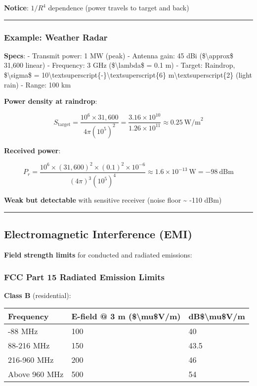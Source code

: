 \textbf{Notice}: \(1/R^4\) dependence (power travels to target and back)

\begin{center}\rule{0.5\linewidth}{0.5pt}\end{center}

\subsubsection{Example: Weather Radar}\label{example-weather-radar}

\textbf{Specs}: - Transmit power: 1 MW (peak) - Antenna gain: 45 dBi
(\$\textbackslash approx\$ 31,600 linear) - Frequency: 3 GHz
(\$\textbackslash lambda\$ = 0.1 m) - Target: Raindrop,
\$\textbackslash sigma\$ =
10\textbackslash textsuperscript\{-\}\textbackslash textsuperscript\{6\}
m\textbackslash textsuperscript\{2\} (light rain) - Range: 100 km

\textbf{Power density at raindrop}:

\[
S_{\text{target}} = \frac{10^6 \times 31,600}{4\pi (10^5)^2} = \frac{3.16 \times 10^{10}}{1.26 \times 10^{11}} \approx 0.25\ \text{W/m}^2
\]

\textbf{Received power}:

\[
P_r = \frac{10^6 \times (31,600)^2 \times (0.1)^2 \times 10^{-6}}{(4\pi)^3 (10^5)^4} \approx 1.6 \times 10^{-13}\ \text{W} = -98\ \text{dBm}
\]

\textbf{Weak but detectable} with sensitive receiver (noise floor
\textasciitilde{} -110 dBm)

\begin{center}\rule{0.5\linewidth}{0.5pt}\end{center}

\subsection{Electromagnetic Interference
(EMI)}\label{electromagnetic-interference-emi}

\textbf{Field strength limits} for conducted and radiated emissions:

\subsubsection{FCC Part 15 Radiated Emission
Limits}\label{fcc-part-15-radiated-emission-limits}

\textbf{Class B} (residential):

{\def\LTcaptype{} %
\begin{longtable}[]{@{}lll@{}}
\toprule\noalign{}
Frequency & E-field @ 3 m (\$\textbackslash mu\$V/m) &
dB\$\textbackslash mu\$V/m \\
\midrule\noalign{}
\endhead
\bottomrule\noalign{}
\endlastfoot
30-88 MHz & 100 & 40 \\
88-216 MHz & 150 & 43.5 \\
216-960 MHz & 200 & 46 \\
Above 960 MHz & 500 & 54 \\
\end{longtable}
}

